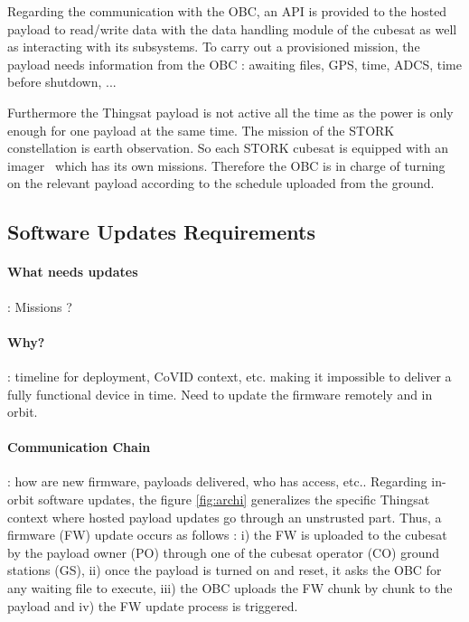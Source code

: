 Regarding the communication with the OBC, an API is provided to the hosted
payload to read/write data with the data handling module of the cubesat as well
as interacting with its subsystems. To carry out a provisioned mission, the
payload needs information from the OBC : awaiting files, GPS,
time, ADCS, time before shutdown, ...

Furthermore the Thingsat payload is not active all the time as the power is only
enough for one payload at the same time. The mission of the STORK constellation
is earth observation. So each STORK cubesat is equipped with an
imager~\cite{wiki:SatRevolution} which has its own missions. Therefore the OBC
is in charge of turning on the relevant payload according to the schedule
uploaded from the ground. 

\subsection{Software Updates Requirements}
\paragraph*{What needs updates}: Missions ? 
\paragraph*{Why?}: timeline for deployment, CoVID context, etc. making it impossible
to deliver a fully functional device in time. Need to update the firmware remotely
and in orbit.
\paragraph*{Communication Chain}: how are new firmware, payloads delivered,
who has access, etc..
Regarding in-orbit software updates, the figure \ref{fig:archi} generalizes the
specific Thingsat context where hosted payload updates go through an unstrusted
part. Thus, a firmware (FW) update occurs as follows : i) the FW is uploaded to
the cubesat by the payload owner (PO) through one of the cubesat operator (CO)
ground stations (GS), ii) once the payload is turned on and reset, it asks
the OBC for any waiting file to execute, iii) the OBC uploads the FW chunk by
chunk to the payload and iv) the FW update process is triggered. 
